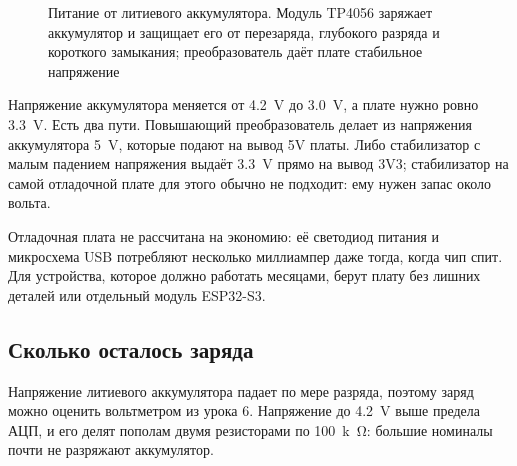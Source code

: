 \begin{figure}[H]
\centering
{}
\caption{Питание от литиевого аккумулятора. Модуль TP4056 заряжает аккумулятор и защищает его от
перезаряда, глубокого разряда и короткого замыкания; преобразователь даёт плате стабильное напряжение}
\end{figure}

Напряжение аккумулятора меняется от \SI{4.2}{V} до \SI{3.0}{V}, а плате нужно ровно \SI{3.3}{V}.
Есть два пути. Повышающий преобразователь делает из напряжения аккумулятора \SI{5}{V}, которые подают
на вывод 5V платы. Либо стабилизатор с малым падением напряжения выдаёт \SI{3.3}{V} прямо на вывод 3V3;
стабилизатор на самой отладочной плате для этого обычно не подходит: ему нужен запас около вольта.

\begin{tip}
Отладочная плата не рассчитана на экономию: её светодиод питания и микросхема USB потребляют несколько
миллиампер даже тогда, когда чип спит. Для устройства, которое должно работать месяцами, берут плату
без лишних деталей или отдельный модуль ESP32-S3.
\end{tip}

\subsection{Сколько осталось заряда}

Напряжение литиевого аккумулятора падает по мере разряда, поэтому заряд можно оценить вольтметром
из урока 6. Напряжение до \SI{4.2}{V} выше предела АЦП, и его делят пополам двумя резисторами по
\SI{100}{k\ohm}: большие номиналы почти не разряжают аккумулятор.


